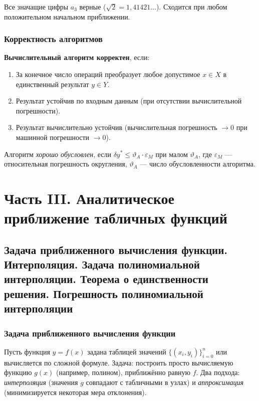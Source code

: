 Все значащие цифры $a_3$ верные ($\sqrt{2} = 1{,}41421\ldots$). Сходится при любом положительном начальном приближении.

\subsubsection*{Корректность алгоритмов}

\textbf{Вычислительный алгоритм корректен}, если:
\begin{enumerate}
    \item За конечное число операций преобразует любое допустимое $x \in X$ в единственный результат $y \in Y$.
    \item Результат устойчив по входным данным (при отсутствии вычислительной погрешности).
    \item Результат вычислительно устойчив (вычислительная погрешность $\to 0$ при машинной погрешности $\to 0$).
\end{enumerate}

Алгоритм \textit{хорошо обусловлен}, если $\delta y^* \leq \vartheta_A \cdot \varepsilon_M$ при малом $\vartheta_A$, где $\varepsilon_M$ --- относительная погрешность округления, $\vartheta_A$ --- число обусловленности алгоритма.

\section{Часть III. Аналитическое приближение табличных функций}

\subsection{Задача приближенного вычисления функции. Интерполяция. Задача полиномиальной интерполяции. Теорема о единственности решения. Погрешность полиномиальной интерполяции}

\subsubsection*{Задача приближенного вычисления функции}

Пусть функция $y = f(x)$ задана таблицей значений $\{(x_i, y_i)\}_{i=0}^{n}$ или вычисляется по сложной формуле. Задача: построить просто вычисляемую функцию $g(x)$ (например, полином), приближённо равную $f$. Два подхода: \textit{интерполяция} (значения $g$ совпадают с табличными в узлах) и \textit{аппроксимация} (минимизируется некоторая мера отклонения).

